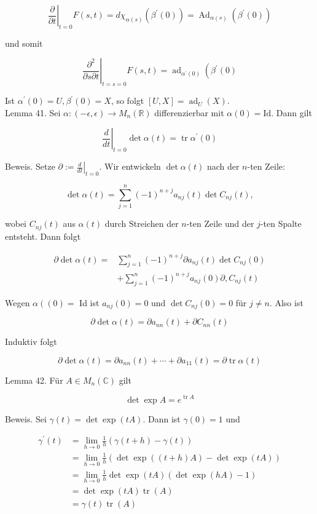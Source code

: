 \documentclass[10pt, letterpaper]{article}
\begin{document}
$$
\left.\frac{\partial}{\partial t}\right|_{t=0} F(s, t)=d \chi_{\alpha(s)}\left(\beta^{\prime}(0)\right)=\operatorname{Ad}_{\alpha(s)}\left(\beta^{\prime}(0)\right)
$$

und somit

$$
\left.\frac{\partial^{2}}{\partial s \partial t}\right|_{t=s=0} F(s, t)=\operatorname{ad}_{\alpha^{\prime}(0)}\left(\beta^{\prime}(0)\right.
$$

Ist $\alpha^{\prime}(0)=U, \beta^{\prime}(0)=X$, so folgt $[U, X]=\operatorname{ad}_{U}(X)$.\\
Lemma 41. Sei $\alpha:(-\epsilon, \epsilon) \rightarrow M_{n}(\mathbb{R})$ differenzierbar mit $\alpha(0)=\mathrm{Id}$. Dann gilt

$$
\left.\frac{d}{d t}\right|_{t=0} \operatorname{det} \alpha(t)=\operatorname{tr} \alpha^{\prime}(0)
$$

Beweis. Setze $\partial:=\left.\frac{d}{d t}\right|_{t=0}$. Wir entwickeln $\operatorname{det} \alpha(t)$ nach der $n$-ten Zeile:

$$
\operatorname{det} \alpha(t)=\sum_{j=1}^{n}(-1)^{n+j} a_{n j}(t) \operatorname{det} C_{n j}(t),
$$

wobei $C_{n j}(t)$ aus $\alpha(t)$ durch Streichen der $n$-ten Zeile und der $j$-ten Spalte entsteht. Dann folgt

$$
\begin{aligned}
\partial \operatorname{det} \alpha(t)= & \sum_{j=1}^{n}(-1)^{n+j} \partial a_{n j}(t) \operatorname{det} C_{n j}(0) \\
& +\sum_{j=1}^{n}(-1)^{n+j} a_{n j}(0) \partial, C_{n j}(t)
\end{aligned}
$$

Wegen $\alpha\left((0)=\right.$ Id ist $a_{n j}(0)=0$ und $\operatorname{det} C_{n j}(0)=0$ für $j \neq n$. Also ist

$$
\partial \operatorname{det} \alpha(t)=\partial a_{n n}(t)+\partial C_{n n}(t)
$$

Induktiv folgt

$$
\partial \operatorname{det} \alpha(t)=\partial a_{n n}(t)+\cdots+\partial a_{11}(t)=\partial \operatorname{tr} \alpha(t)
$$

Lemma 42. Für $A \in M_{n}(\mathbb{C})$ gilt

$$
\operatorname{det} \exp A=e^{\operatorname{tr} A}
$$

Beweis. Sei $\gamma(t)=\operatorname{det} \exp (t A)$. Dann ist $\gamma(0)=1$ und

$$
\begin{aligned}
\gamma^{\prime}(t) & =\lim _{h \rightarrow 0} \frac{1}{h}(\gamma(t+h)-\gamma(t)) \\
& =\lim _{h \rightarrow 0} \frac{1}{h}(\operatorname{det} \exp ((t+h) A)-\operatorname{det} \exp (t A)) \\
& =\lim _{h \rightarrow 0} \frac{1}{h} \operatorname{det} \exp (t A)(\operatorname{det} \exp (h A)-1) \\
& =\operatorname{det} \exp (t A) \operatorname{tr}(A) \\
& =\gamma(t) \operatorname{tr}(A)
\end{aligned}
$$
\end{document}
